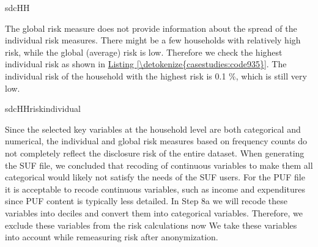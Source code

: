\documentclass[letterpaper,10pt,english]{sphinxmanual}
\begin{document}
\def\sphinxLiteralBlockLabel{\label{\detokenize{casestudies:code934}}}
%
\begin{sphinxVerbatim}[commandchars=\\\{\},numbers=left,firstnumber=1,stepnumber=1]
sdcHH 
\end{sphinxVerbatim}

The global risk measure does not provide information about the spread of
the individual risk measures. There might be a few households with
relatively high risk, while the global (average) risk is low. Therefore
we check the highest individual risk as shown in \hyperref[\detokenize{casestudies:code935}]{Listing \ref{\detokenize{casestudies:code935}}}. The
individual risk of the household with the highest risk is 0.1 \%, which
is still very low.

\def\sphinxLiteralBlockLabel{\label{\detokenize{casestudies:code935}}}
%
\begin{sphinxVerbatim}[commandchars=\\\{\},numbers=left,firstnumber=1,stepnumber=1]
sdcHHriskindividual\PYG{p}{[} \PYG{p}{]}
\end{sphinxVerbatim}

Since the selected key variables at the household level are both
categorical and numerical, the individual and global risk measures based
on frequency counts do not completely reflect the disclosure risk of the
entire dataset. When generating the SUF file, we concluded that recoding
of continuous variables to make them all categorical would likely not
satisfy the needs of the SUF users. For the PUF file it is acceptable to
recode continuous variables, such as income and expenditures since PUF
content is typically less detailed. In Step 8a we will recode these
variables into deciles and convert them into categorical variables.
Therefore, we exclude these variables from the risk calculations now We
take these variables into account while remeasuring risk after
anonymization.
\end{document}
